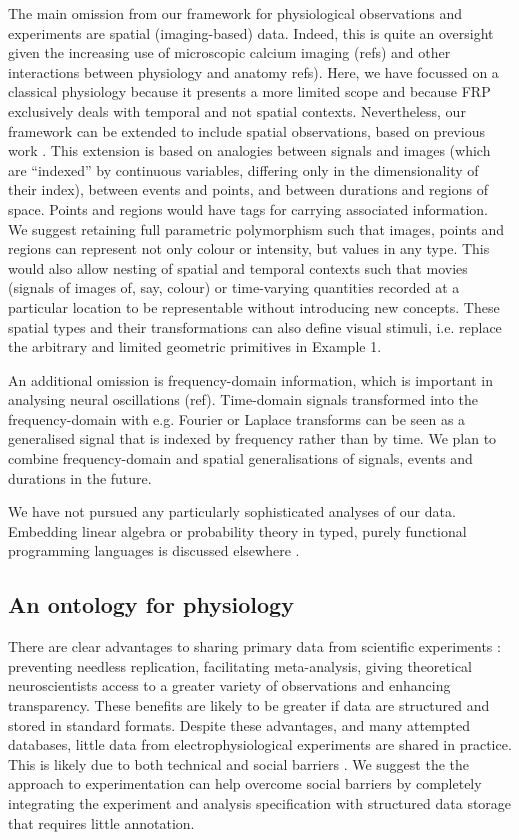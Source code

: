 The main omission from our framework for physiological observations
and experiments are spatial (imaging-based) data. Indeed, this is
quite an oversight given the increasing use of microscopic calcium
imaging (refs) and other interactions between physiology and anatomy
refs). Here, we have focussed on a classical physiology because it
presents a more limited scope and because FRP exclusively deals with
temporal and not spatial contexts. Nevertheless, our framework can be
extended to include spatial observations, based on previous work
\citep{Elliott2003}. This extension is based on analogies between
signals and images (which are ``indexed'' by continuous variables,
differing only in the dimensionality of their index), between events
and points, and between durations and regions of space. Points and
regions would have tags for carrying associated information. We
suggest retaining full parametric polymorphism such that images,
points and regions can represent not only colour or intensity, but
values in any type. This would also allow nesting of spatial and
temporal contexts such that movies (signals of images of, say, colour)
or time-varying quantities recorded at a particular location
\citep[for instance spot calcium measurements as points of signals of
concentration;][]{DiGregorio1999} to be representable without
introducing new concepts. These spatial types and their
transformations can also define visual stimuli, i.e. replace the
arbitrary and limited geometric primitives in Example 1.

An additional omission is frequency-domain information, which is
important in analysing neural oscillations (ref). Time-domain signals
transformed into the frequency-domain with e.g. Fourier or Laplace
transforms can be seen as a generalised signal that is indexed by
frequency rather than by time. We plan to combine frequency-domain and
spatial generalisations of signals, events and durations in the future.

We have not pursued any particularly sophisticated analyses of our
data. Embedding linear algebra or probability theory in typed, purely
functional programming languages is discussed elsewhere
\citep{Eaton2006, Park2005}.

\subsection*{An ontology for physiology}

There are clear advantages to sharing primary data from scientific
experiments \citep{Insel2003}: preventing needless replication,
facilitating meta-analysis, giving theoretical neuroscientists access
to a greater variety of observations and enhancing transparency. These
benefits are likely to be greater if data are structured and stored in
standard formats. Despite these advantages, and many attempted
databases, little data from electrophysiological experiments are
shared in practice. This is likely due to both technical and social
barriers \citep{Amari2002}. We suggest the the approach to
experimentation can help overcome social barriers by completely
integrating the experiment and analysis specification with structured
data storage that requires little annotation.


